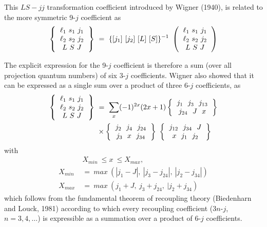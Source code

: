 This $LS-jj$ transformation coefficient introduced by Wigner (1940), is related to 
the more symmetric 9-$j$ coefficient as
\begin{equation}
\left\{
\begin{tabular}{c}
$\ell_1 \ s_1 \ j_1$\\   
$\ell_2 \ s_2 \ j_2$\\ 
$L \ S \ J$\\ 
\end{tabular}
\right\} \ =\ \{ [j_1]\ [j_2]\ [L]\ [S] \}^{-1}\
\left(
\begin{tabular}{c}
$\ell_1 \ s_1 \ j_1$\\   
$\ell_2 \ s_2 \ j_2$\\ 
$L \ S \ J$\\ 
\end{tabular} 
\right) \label{chap29-eq51}
\end{equation}

The explicit expression for the 9-$j$ coefficient is therefore a sum (over all 
projection quantum numbers) of six 3-$j$ coefficients. Wigner also showed that it can
be expressed as a single sum over a product of three 6-$j$ coefficients, as
\begin{equation}
\begin{split}
\left\{
\begin{tabular}{c}
$\ell_1 \ s_1 \ j_1$\\   
$\ell_2 \ s_2 \ j_2$\\ 
$L \ S \ J$\\ \end{tabular} 
\right\} \
& =\ \sum_x (-1)^{2x} (2x+1) 
\left\{ 
\begin{tabular}{c}
$j_1\ \ j_3\ \ j_{13}$\\ 
$j_{24}\ \ J\ \ x$ \\ 
\end{tabular} 
\right\}\\
& \times \left\{
\begin{tabular}{c}
$j_2\ \ j_4\ \ j_{24}$\\ 
$j_{3}\ \ x\ \ j_{34}$ \\ 
\end{tabular} 
\right\} \
\left\{ 
\begin{tabular}{c} 
$j_{12}\ \ j_{34}\ \ J$\\ 
$x\ \ j_1\ \ j_2$ \\ 
\end{tabular} 
\right\} \label{chap29-eq52}
\end{split}
\end{equation}
with 
\begin{equation}
\begin{split}
& X_{min} \ \leq x \ \leq X_{max},\\
X_{min} \ & =\ max \ (|j_1-J|,\ |j_3-j_{24}|,\ |j_2-j_{34}|)\\
X_{max} \ & =\ max \ (j_1+J,\ j_3+j_{24},\ |j_2+j_{34})\label{chap29-eq53}
\end{split}
\end{equation}
which follows from the fundamental theorem of recoupling theory (Biedenharn and Louck, 
1981) according to which every recoupling coefficient (3$n$-$j$, $n=3,4,\ldots$) is 
expressible as a summation over a product of 6-$j$ coefficients.

